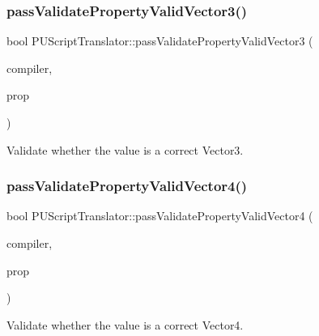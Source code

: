 \subsubsection{\texorpdfstring{pass\+Validate\+Property\+Valid\+Vector3()}{passValidatePropertyValidVector3()}\hspace{0.1cm}{\footnotesize\ttfamily [2/2]}}
{\footnotesize\ttfamily bool P\+U\+Script\+Translator\+::pass\+Validate\+Property\+Valid\+Vector3 (\begin{DoxyParamCaption}\item[{\hyperlink{classPUScriptCompiler}{P\+U\+Script\+Compiler} $\ast$}]{compiler,  }\item[{\hyperlink{classPUPropertyAbstractNode}{P\+U\+Property\+Abstract\+Node} $\ast$}]{prop }\end{DoxyParamCaption})}

Validate whether the value is a correct Vector3. \mbox{\label{classPUScriptTranslator_ab2c9eac05b8db1e39f208934a006518f}} 
\subsubsection{\texorpdfstring{pass\+Validate\+Property\+Valid\+Vector4()}{passValidatePropertyValidVector4()}\hspace{0.1cm}{\footnotesize\ttfamily [1/2]}}
{\footnotesize\ttfamily bool P\+U\+Script\+Translator\+::pass\+Validate\+Property\+Valid\+Vector4 (\begin{DoxyParamCaption}\item[{\hyperlink{classPUScriptCompiler}{P\+U\+Script\+Compiler} $\ast$}]{compiler,  }\item[{\hyperlink{classPUPropertyAbstractNode}{P\+U\+Property\+Abstract\+Node} $\ast$}]{prop }\end{DoxyParamCaption})}

Validate whether the value is a correct Vector4. \mbox{\label{classPUScriptTranslator_ab2c9eac05b8db1e39f208934a006518f}} 
